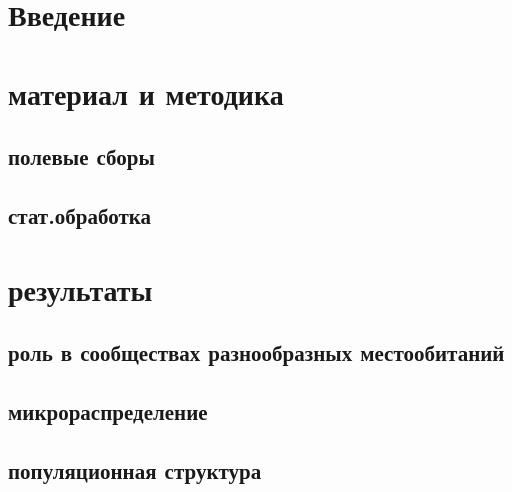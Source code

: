 \documentclass[12pt, a4paper]{article}
\begin{document}

\section{Введение}

\section{материал и методика}

        \subsection{полевые сборы}

        \subsection{стат.обработка}

\section{результаты}

        \subsection{роль в сообществах разнообразных местообитаний}



        \subsection{микрораспределение}

        \subsection{популяционная структура}
\end{document}
